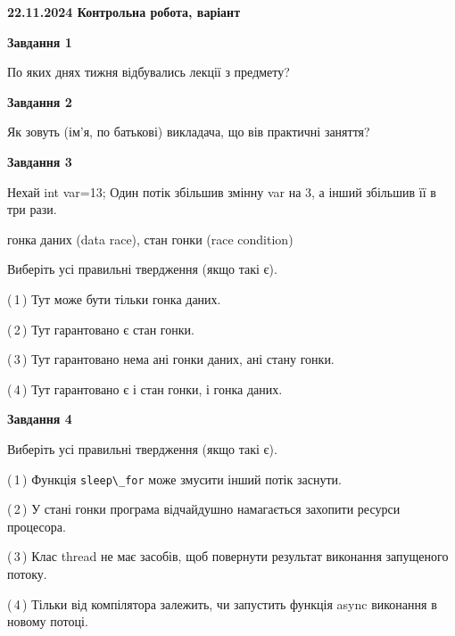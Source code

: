 \documentclass[12pt, ukrainian]{article}
\def\code#1{\Verb!#1!}
\begin{document}
\begin {large}

\textbf{22.11.2024 Контрольна робота, варіант  }\par


{

\begin{center}
\textbf{Завдання 1}
\end{center}

По яких днях тижня відбувались лекції з предмету?


\begin{center}
\textbf{Завдання 2}
\end{center}

Як зовуть (ім'я, по батькові) викладача, що вів практичні заняття?


\begin{center}
\textbf{Завдання 3}
\end{center}

Нехай int var=13; Один потік збільшив змінну var на 3, а інший збільшив її в три рази.

гонка даних (data race), стан гонки (race condition)

Виберіть усі правильні твердження (якщо такі є).\par
\vspace{2mm}
(\,1\,) Тут може бути тільки гонка даних.%

(\,2\,) Тут гарантовано є стан гонки.%

(\,3\,) Тут гарантовано нема ані гонки даних, ані стану гонки.%

(\,4\,) Тут гарантовано є і стан гонки, і гонка даних.%


\begin{center}
\textbf{Завдання 4}
\end{center}

Виберіть усі правильні твердження (якщо такі є).\par
\vspace{2mm}

(\,1\,) Функція \code{sleep\_for} може змусити інший потік заснути.%

(\,2\,) У стані гонки програма відчайдушно намагається захопити ресурси процесора.%

(\,3\,) Клас thread не має засобів, щоб повернути результат виконання запущеного потоку.%

(\,4\,) Тільки від компілятора залежить, чи запустить функція async виконання в новому потоці.%


}
\end{large}
\end{document}
